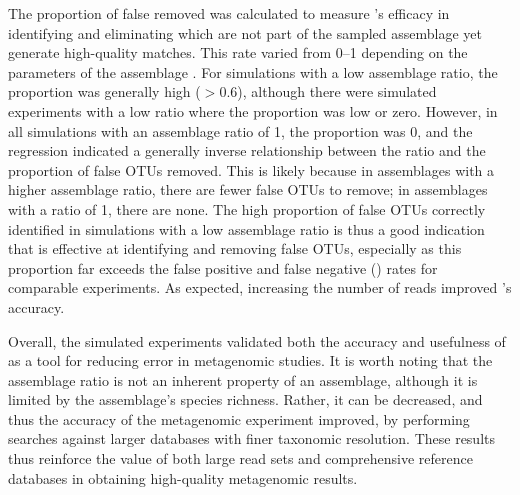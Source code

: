 The proportion of false  removed was calculated to measure 's efficacy in identifying and eliminating  which are not part of the sampled assemblage yet generate high-quality  matches.
This rate varied from 0--1 depending on the parameters of the assemblage .
For simulations with a low assemblage ratio, the proportion was generally high ($> 0.6$), although there were simulated experiments with a low ratio where the proportion was low or zero.
However, in all simulations with an assemblage ratio of 1, the proportion was 0, and the regression indicated a generally inverse relationship between the ratio and the proportion of false \acp{OTU} removed.
This is likely because in assemblages with a higher assemblage ratio, there are fewer false \acp{OTU} to remove; in assemblages with a ratio of 1, there are none.
The high proportion of false \acp{OTU} correctly identified in simulations with a low assemblage ratio is thus a good indication that  is effective at identifying and removing false \acp{OTU}, especially as this proportion far exceeds the false positive and false negative () rates for comparable experiments.
As expected, increasing the number of reads improved 's accuracy.

Overall, the simulated experiments validated both the accuracy and usefulness of  as a tool for reducing error in metagenomic studies.
It is worth noting that the assemblage ratio is not an inherent property of an assemblage, although it is limited by the assemblage's species richness.
Rather, it can be decreased, and thus the accuracy of the metagenomic experiment improved, by performing  searches against larger databases with finer taxonomic resolution.
These results thus reinforce the value of both large read sets and comprehensive reference databases in obtaining high-quality metagenomic results.
